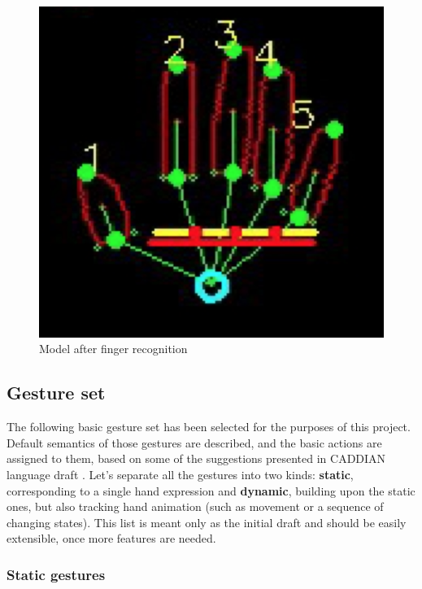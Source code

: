 \documentclass[a4paper,11pt,oneside]{article}
\begin{document}
  \begin{figure}[H]
  \centering
  \includegraphics[scale=0.7]{hand-recognized.png}
  \caption{Model after finger recognition}
  \end{figure}
 
  \subsection{Gesture set}
	
    The following basic gesture set has been selected for the purposes of this project. Default semantics of those gestures are described, and the basic actions are assigned to them, based on some of the suggestions presented in CADDIAN language draft \cite{AB01}. Let's separate all the gestures into two kinds: \textbf{static}, corresponding to a single hand expression and \textbf{dynamic},  building upon the static ones, but also tracking hand animation (such as movement or a sequence of changing states). This list is meant only as the initial draft and should be easily extensible, once more features are needed.
    
    \subsubsection{Static gestures}
    
\end{document}
